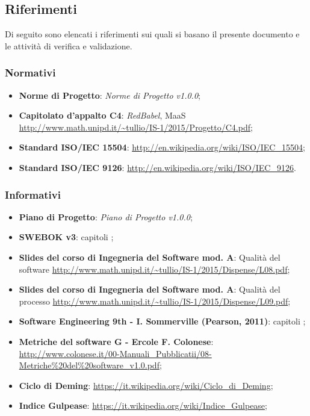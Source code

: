 \subsection{Riferimenti}
Di seguito  sono elencati i riferimenti sui quali si basano il presente documento e le attività di verifica e validazione.

\subsubsection{Normativi}
\begin{itemize}
	\item \textbf{Norme di Progetto}: \textit{Norme di Progetto v1.0.0};
	\item \textbf{Capitolato d'appalto C4}: \textit{RedBabel}, MaaS \url{http://www.math.unipd.it/~tullio/IS-1/2015/Progetto/C4.pdf};
	\item \textbf{Standard ISO/IEC 15504}: \url{http://en.wikipedia.org/wiki/ISO/IEC_15504};
	\item \textbf{Standard ISO/IEC 9126}: \url{http://en.wikipedia.org/wiki/ISO/IEC_9126}.
\end{itemize}
	
\subsubsection{Informativi}
\begin{itemize}
	\item \textbf{Piano di Progetto}: \textit{Piano di Progetto v1.0.0};
	\item \textbf{SWEBOK v3}: capitoli ;%
	\item \textbf{Slides del corso di Ingegneria del Software mod. A}: Qualit\`a del software \url{http://www.math.unipd.it/~tullio/IS-1/2015/Dispense/L08.pdf};
	\item \textbf{Slides del corso di Ingegneria del Software mod. A}: Qualit\`a del processo \url{http://www.math.unipd.it/~tullio/IS-1/2015/Dispense/L09.pdf};
	\item \textbf{Software Engineering 9th - I. Sommerville (Pearson, 2011)}: capitoli ; %
	\item \textbf{Metriche del software G - Ercole F. Colonese}: \url{http://www.colonese.it/00-Manuali_Pubblicatii/08-Metriche%20del%20software_v1.0.pdf};
	\item \textbf{Ciclo di Deming}: \url{https://it.wikipedia.org/wiki/Ciclo_di_Deming};
	\item \textbf{Indice Gulpease}: \url{https://it.wikipedia.org/wiki/Indice_Gulpease};
\end{itemize}